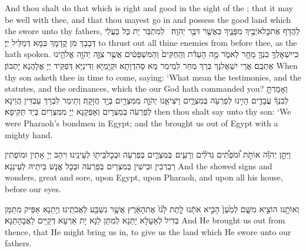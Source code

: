 {And thou shalt do that which is right and good in the sight of the \lord; that it may be well with thee, and that thou mayest go in and possess the good land which the \lord\space swore unto thy fathers,}{}
{לַהֲדֹ֥ף אֶת\maqqaf כׇּל\maqqaf אֹיְבֶ֖יךָ מִפָּנֶ֑יךָ כַּאֲשֶׁ֖ר דִּבֶּ֥ר יְהֹוָֽה׃ \setuma }
{לְמִתְבַּר יָת כָּל בַּעֲלֵי דְּבָבָךְ מִן קֳדָמָךְ כְּמָא דְּמַלֵּיל יְיָ׃}
{to thrust out all thine enemies from before thee, as the \lord\space hath spoken.}{}
{כִּֽי\maqqaf יִשְׁאׇלְךָ֥ בִנְךָ֛ מָחָ֖ר לֵאמֹ֑ר מָ֣ה הָעֵדֹ֗ת וְהַֽחֻקִּים֙ וְהַמִּשְׁפָּטִ֔ים אֲשֶׁ֥ר צִוָּ֛ה יְהֹוָ֥ה אֱלֹהֵ֖ינוּ אֶתְכֶֽם׃}
{אֲרֵי יִשְׁאֲלִנָּךְ בְּרָךְ מְחַר לְמֵימַר מָא סָהִדְוָתָא וּקְיָמַיָּא וְדִינַיָּא דְּפַקֵּיד יְיָ אֱלָהֲנָא יָתְכוֹן׃}
{When thy son asketh thee in time to come, saying: ‘What mean the testimonies, and the statutes, and the ordinances, which the \lord\space our God hath commanded you?}{}
{וְאָמַרְתָּ֣ לְבִנְךָ֔ עֲבָדִ֛ים הָיִ֥ינוּ לְפַרְעֹ֖ה בְּמִצְרָ֑יִם וַיֹּצִיאֵ֧נוּ יְהֹוָ֛ה מִמִּצְרַ֖יִם בְּיָ֥ד חֲזָקָֽה׃}
{וְתֵימַר לִבְרָךְ עַבְדִּין הֲוֵינָא לְפַרְעֹה בְּמִצְרָיִם וְאַפְּקַנָא יְיָ מִמִּצְרַיִם בְּיַד תַּקִּיפָא׃}
{then thou shalt say unto thy son: ‘We were Pharaoh’s bondmen in Egypt; and the \lord\space brought us out of Egypt with a mighty hand.}{}

{וַיִּתֵּ֣ן יְהֹוָ֡ה אוֹתֹ֣ת וּ֠מֹפְתִ֠ים גְּדֹלִ֨ים וְרָעִ֧ים \pasek  בְּמִצְרַ֛יִם בְּפַרְעֹ֥ה וּבְכׇל\maqqaf בֵּית֖וֹ לְעֵינֵֽינוּ׃}
{וִיהַב יְיָ אָתִין וּמוֹפְתִין רַבְרְבִין וּבִישִׁין בְּמִצְרַיִם בְּפַרְעֹה וּבְכָל אֱנָשׁ בֵּיתֵיהּ לְעֵינַנָא׃}
{And the \lord\space showed signs and wonders, great and sore, upon Egypt, upon Pharaoh, and upon all his house, before our eyes.}{}

{וְאוֹתָ֖נוּ הוֹצִ֣יא מִשָּׁ֑ם לְמַ֙עַן֙ הָבִ֣יא אֹתָ֔נוּ לָ֤תֶת לָ֙נוּ֙ אֶת\maqqaf הָאָ֔רֶץ אֲשֶׁ֥ר נִשְׁבַּ֖ע לַאֲבֹתֵֽינוּ׃}
{וְיָתַנָא אַפֵּיק מִתַּמָּן בְּדִיל לְאַעָלָא יָתַנָא לְמִתַּן לַנָא יָת אַרְעָא דְּקַיֵּים לַאֲבָהָתַנָא׃}
{And He brought us out from thence, that He might bring us in, to give us the land which He swore unto our fathers.}{}

